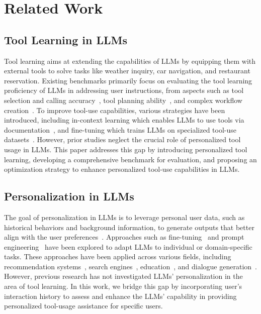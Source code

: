 \section{Related Work}
\subsection{Tool Learning in LLMs}
Tool learning aims at extending the capabilities of LLMs by equipping them with external tools to solve tasks like weather inquiry, car navigation, and restaurant reservation. Existing benchmarks primarily focus on evaluating the tool learning proficiency of LLMs in addressing user instructions, from aspects such as 
tool selection and calling accuracy~\cite{xu-etal-2024-enhancing-tool,NEURIPS2024_8a75ee6d,ye-etal-2024-rotbench,wang2025mtubench}, tool planning ability~\cite{basu-etal-2024-api,wang-etal-2024-appbench,NEURIPS2024_085185ea,liu2025toolace}, and complex workflow creation~\cite{shen2025shortcutsbench,qiao2025benchmarking,fan2025workflowllm}. To improve tool-use capabilities, various strategies have been introduced, including in-context learning which enables LLMs to use tools via documentation~\cite{yuan2024easytool,shi-etal-2024-learning,qu2025from},
and fine-tuning which trains LLMs on specialized tool-use datasets~\cite{zhuang2024toolchain,chen2024advancing,chen2025learning}. However, prior studies neglect the crucial role of personalized tool usage in LLMs. This paper addresses this gap by introducing personalized tool learning, developing a comprehensive benchmark for evaluation, and proposing an optimization strategy to enhance personalized tool-use capabilities in LLMs.

\subsection{Personalization in LLMs}
The goal of personalization in LLMs is to leverage personal user data, such as historical behaviors and background information, to generate outputs that better align with the user preferences~\cite{tseng-etal-2024-two}.
Approaches such as fine-tuning~\cite{cai2025large} and prompt engineering~\cite{yuan-etal-2025-personalized}
have been explored to adapt LLMs to individual or domain-specific tasks. These approaches have been applied across various fields, including recommendation systems~\cite{lyu-etal-2024-llm}, search engines~\cite{10.1145/3589334.3645482}, education~\cite{liu2024socraticlm}, 
and dialogue generation~\cite{wang-etal-2023-target}. However, previous research has not investigated LLMs' personalization in the area of tool learning. In this work, we bridge this gap by incorporating user's interaction history to assess and enhance the LLMs' capability in providing personalized tool-usage assistance for specific users.



